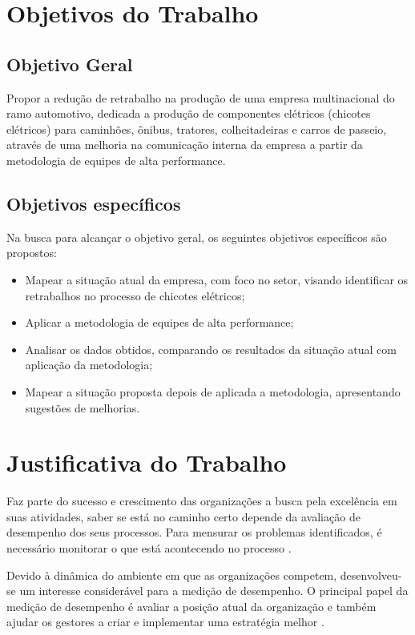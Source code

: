 \documentclass[
	12pt,
	openright,
	oneside, %
	a4paper,
	chapter=TITLE,
	section=TITLE,
	english,
	brazil %
	]{abntex2-udesc}
\begin{document}
\section{Objetivos do Trabalho}
\subsection{Objetivo Geral}

Propor a redução de retrabalho na produção de uma empresa multinacional do ramo
automotivo, dedicada a produção de componentes elétricos (chicotes elétricos) para
caminhões, ônibus, tratores, colheitadeiras e carros de passeio, através de uma melhoria na
comunicação interna da empresa a partir da metodologia de equipes de alta performance.

\subsection{Objetivos específicos}

Na busca para alcançar o objetivo geral, os seguintes objetivos específicos são
propostos:
\begin{itemize}[noitemsep,topsep=0pt]
\item Mapear a situação atual da empresa, com foco no setor, visando identificar os
retrabalhos no processo de chicotes elétricos;
\item Aplicar a metodologia de equipes de alta performance;
\item Analisar os dados obtidos, comparando os resultados da situação atual com
aplicação da metodologia;
\item Mapear a situação proposta depois de aplicada a metodologia, apresentando
sugestões de melhorias.
\end{itemize}

\section{Justificativa do Trabalho}
Faz parte do sucesso e crescimento das organizações a busca pela excelência em suas
atividades, saber se está no caminho certo depende da avaliação de desempenho dos seus
processos. Para mensurar os problemas identificados, é necessário monitorar o que está
acontecendo no processo \cite{jaeger2014etal}.

Devido à dinâmica do ambiente em que as organizações competem, desenvolveu-se
um interesse considerável para a medição de desempenho. O principal papel da medição de
desempenho é avaliar a posição atual da organização e também ajudar os gestores a criar e
implementar uma estratégia melhor \cite{ivanov2014etal}.
\end{document}
